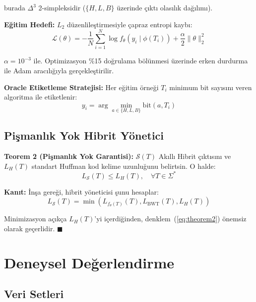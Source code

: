 \documentclass[conference]{IEEEtran}
\begin{document}
burada \(\Delta^3\) 2-simpleksidir (\(\{H, L, B\}\) üzerinde çıktı olasılık dağılımı).

\noindent\textbf{Eğitim Hedefi:} \(L_2\) düzenlileştirmesiyle çapraz entropi kaybı:
\begin{equation}
\mathcal{L}(\theta) = -\frac{1}{N} \sum_{i=1}^{N} \log f_\theta(y_i \mid \phi(T_i)) + \frac{\alpha}{2} \|\theta\|_2^2
\label{eq:loss}
\end{equation}

\(\alpha = 10^{-3}\) ile. Optimizasyon \%15 doğrulama bölünmesi üzerinde erken durdurma ile Adam aracılığıyla gerçekleştirilir.

\noindent\textbf{Oracle Etiketleme Stratejisi:} Her eğitim örneği \(T_i\) minimum bit sayısını veren algoritma ile etiketlenir:
\begin{equation}
y_i = \arg\min_{a \in \{H, L, B\}} \text{bit}(a, T_i)
\label{eq:oracle}
\end{equation}

\subsection{Pişmanlık Yok Hibrit Yönetici}

\noindent\textbf{Teorem 2 (Pişmanlık Yok Garantisi):} \(\mathcal{S}(T)\) Akıllı Hibrit çıktısını ve \(L_H(T)\) standart Huffman kod kelime uzunluğunu belirtsin. O halde:
\begin{equation}
L_\mathcal{S}(T) \leq L_H(T), \quad \forall T \in \Sigma^*
\label{eq:theorem2}
\end{equation}

\noindent\textbf{Kanıt:} İnşa gereği, hibrit yöneticisi şunu hesaplar:
\begin{equation}
L_\mathcal{S}(T) = \min(L_{f_\theta(T)}(T), L_{\text{BWT}}(T), L_H(T))
\label{eq:hybrid_def}
\end{equation}

Minimizasyon açıkça \(L_H(T)\)'yi içerdiğinden, denklem~(\ref{eq:theorem2}) önemsiz olarak geçerlidir. \(\blacksquare\)

\section{Deneysel Değerlendirme}

\subsection{Veri Setleri}
\end{document}
